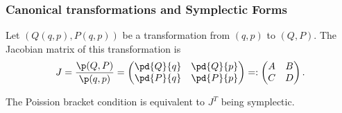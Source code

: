 \subsubsection*{Canonical transformations and Symplectic Forms}
Let $(Q(q,p),P(q,p))$ be a transformation from $(q,p)$ to $(Q,P)$. The 
Jacobian matrix of this transformation is
\begin{equation*}
    J = \frac{\p(Q,P)}{\p(q,p)} = 
    \begin{pmatrix}
        \pd{Q}{q} & \pd{Q}{p} \\ \pd{P}{q} & \pd{P}{p}
    \end{pmatrix} =: 
    \begin{pmatrix}
        A & B \\ C & D
    \end{pmatrix}.
\end{equation*}
\begin{theorem}
    The Poission bracket condition is equivalent to $J^T$ being symplectic.
\end{theorem}
